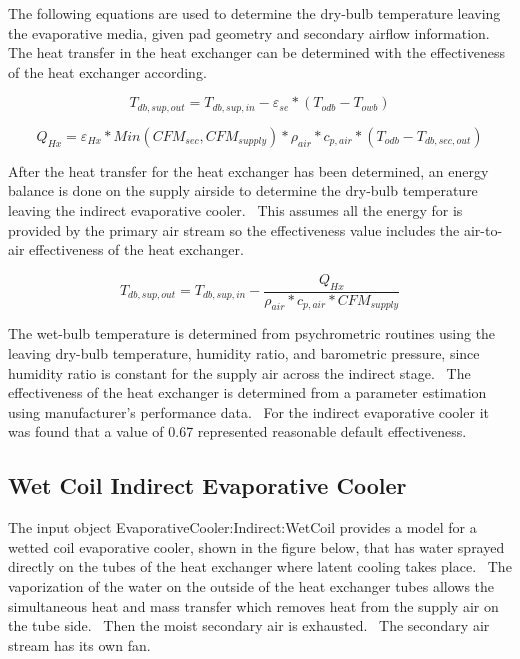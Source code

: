 The following equations are used to determine the dry-bulb temperature leaving the evaporative media, given pad geometry and secondary airflow information.~ The heat transfer in the heat exchanger can be determined with the effectiveness of the heat exchanger according.

\begin{equation}
T_{db,sup,out} = T_{db,sup,in} - \varepsilon_{se}*(T_{odb} - T_{owb})
\end{equation}

\begin{equation}
Q_{Hx} = \varepsilon_{Hx} * Min( CFM_{sec}, CFM_{supply}) * \rho_{air} * c_{p,air} * ( T_{odb} - T_{db,sec,out})
\end{equation}

After the heat transfer for the heat exchanger has been determined, an energy balance is done on the supply airside to determine the dry-bulb temperature leaving the indirect evaporative cooler. ~This assumes all the energy for is provided by the primary air stream so the effectiveness value includes the air-to-air effectiveness of the heat exchanger.

\begin{equation}
T_{db,sup,out} = T_{db,sup,in} - \frac{{{Q_{Hx}}}}{{{\rho_{air}}*{c_{p,air}}*CF{M_{supply}}}}
\end{equation}

The wet-bulb temperature is determined from psychrometric routines using the leaving dry-bulb temperature, humidity ratio, and barometric pressure, since humidity ratio is constant for the supply air across the indirect stage.~ The effectiveness of the heat exchanger is determined from a parameter estimation using manufacturer's performance data.~ For the indirect evaporative cooler it was found that a value of 0.67 represented reasonable default effectiveness.

\subsection{Wet Coil Indirect Evaporative Cooler}\label{wet-coil-indirect-evaporative-cooler}

The input object EvaporativeCooler:Indirect:WetCoil provides a model for a wetted coil evaporative cooler, shown in the figure below, that has water sprayed directly on the tubes of the heat exchanger where latent cooling takes place.~ The vaporization of the water on the outside of the heat exchanger tubes allows the simultaneous heat and mass transfer which removes heat from the supply air on the tube side.~ Then the moist secondary air is exhausted.~ The secondary air stream has its own fan.

